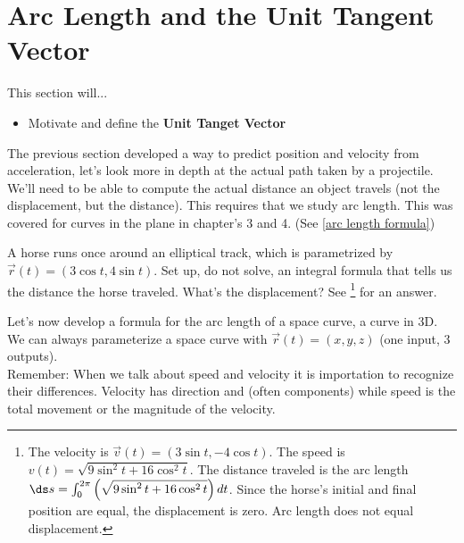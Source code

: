 {}
%


\section{Arc Length and the Unit Tangent Vector}
This section will...
\begin{itemize}
\item Motivate and define the \textbf{Unit Tanget Vector}
\end{itemize}


The previous section developed a way to predict position and velocity from acceleration, let's look more in depth at the actual path taken by a projectile. We'll need to be able to compute the actual distance an object travels (not the displacement, but the distance).  This requires that we study arc length.  This was covered for curves in the plane in chapter's 3 and 4. (See \ref{arc length formula})

\begin{review*}
 A horse runs once around an elliptical track, which is parametrized by $\vec r(t) = (3\cos t,4\sin t)$.  Set up, do not solve, an integral formula that tells us the distance the horse traveled. What's the displacement? See 
\footnote{The velocity is $\vec v(t) = (3\sin t, -4\cos t)$. The speed is $v(t) = \sqrt{9\sin^2t+16\cos^2t}$. The distance traveled is the arc length $\ds s=\int_0^{2\pi} \left(\sqrt{9\sin^2t+16\cos^2t}\right)dt$. Since the horse's initial and final position are equal, the displacement is zero. Arc length does not equal displacement. }
for an answer.
\end{review*}
 

Let's now develop a formula for the arc length of a space curve, a curve in 3D. We can always parameterize a space curve with $\vec r(t) = (x,y,z)$ (one input, 3 outputs).\\

Remember: When we talk about speed and velocity it is importation to recognize their differences. Velocity has direction and (often components) while speed is the total movement or the magnitude of the velocity.\\

